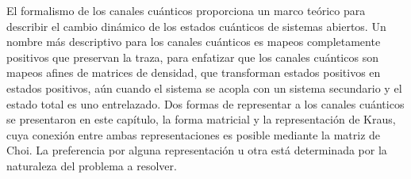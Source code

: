 El formalismo de los canales cuánticos proporciona un marco 
teórico para describir el cambio dinámico de los estados cuánticos 
de sistemas abiertos. Un nombre más descriptivo para 
los canales cuánticos es mapeos completamente 
positivos que preservan la traza, para enfatizar 
que los canales cuánticos son mapeos afines de matrices de 
densidad, que transforman estados positivos en estados positivos,
aún cuando el sistema se acopla con un sistema secundario y el estado
total es uno entrelazado. 
Dos formas de representar a los canales cuánticos
se presentaron en este capítulo, la forma matricial y 
la representación de Kraus, cuya conexión entre ambas representaciones
es posible mediante la matriz de Choi.
La preferencia por alguna representación u otra está determinada 
por la naturaleza del problema a resolver. 
